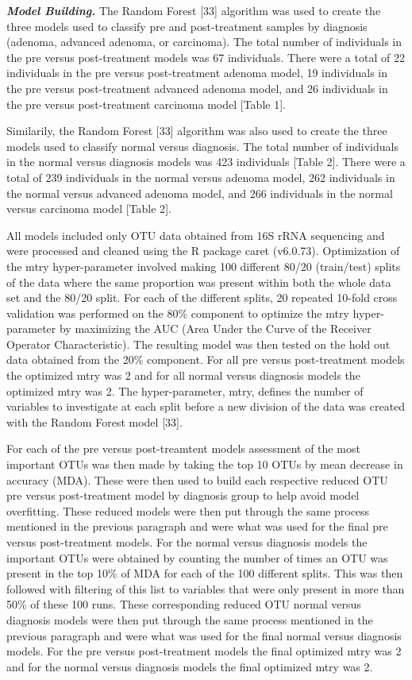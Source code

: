 \documentclass[12pt,]{article}
\begin{document}
\textbf{\emph{Model Building.}} The Random Forest {[}33{]} algorithm was
used to create the three models used to classify pre and post-treatment
samples by diagnosis (adenoma, advanced adenoma, or carcinoma). The
total number of individuals in the pre versus post-treatment models was
67 individuals. There were a total of 22 individuals in the pre versus
post-treatment adenoma model, 19 individuals in the pre versus
post-treatment advanced adenoma model, and 26 individuals in the pre
versus post-treatment carcinoma model {[}Table 1{]}.

Similarily, the Random Forest {[}33{]} algorithm was also used to create
the three models used to classify normal versus diagnosis. The total
number of individuals in the normal versus diagnosis models was 423
individuals {[}Table 2{]}. There were a total of 239 individuals in the
normal versus adenoma model, 262 individuals in the normal versus
advanced adenoma model, and 266 individuals in the normal versus
carcinoma model {[}Table 2{]}.

All models included only OTU data obtained from 16S rRNA sequencing and
were processed and cleaned using the R package caret (v6.0.73).
Optimization of the mtry hyper-parameter involved making 100 different
80/20 (train/test) splits of the data where the same proportion was
present within both the whole data set and the 80/20 split. For each of
the different splits, 20 repeated 10-fold cross validation was performed
on the 80\% component to optimize the mtry hyper-parameter by maximizing
the AUC (Area Under the Curve of the Receiver Operator Characteristic).
The resulting model was then tested on the hold out data obtained from
the 20\% component. For all pre versus post-treatment models the
optimized mtry was 2 and for all normal versus diagnosis models the
optimized mtry was 2. The hyper-parameter, mtry, defines the number of
variables to investigate at each split before a new division of the data
was created with the Random Forest model {[}33{]}.

For each of the pre versus post-treamtent models assessment of the most
important OTUs was then made by taking the top 10 OTUs by mean decrease
in accuracy (MDA). These were then used to build each respective reduced
OTU pre versus post-treatment model by diagnosis group to help avoid
model overfitting. These reduced models were then put through the same
process mentioned in the previous paragraph and were what was used for
the final pre versus post-treatment models. For the normal versus
diagnosis models the important OTUs were obtained by counting the number
of times an OTU was present in the top 10\% of MDA for each of the 100
different splits. This was then followed with filtering of this list to
variables that were only present in more than 50\% of these 100 runs.
These corresponding reduced OTU normal versus diagnosis models were then
put through the same process mentioned in the previous paragraph and
were what was used for the final normal versus diagnosis models. For the
pre versus post-treatment models the final optimized mtry was 2 and for
the normal versus diagnosis models the final optimized mtry was 2.
\end{document}
